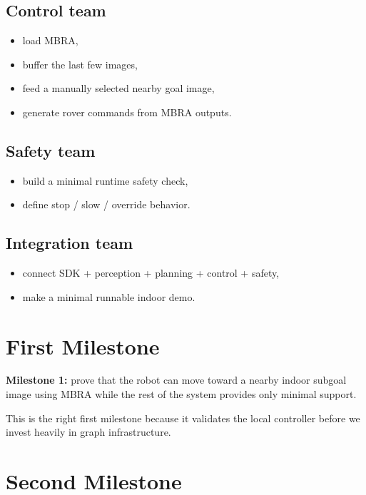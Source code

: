 \documentclass[11pt,a4paper]{article}
\begin{document}
\subsection*{Control team}
\begin{itemize}[nosep]
  \item load MBRA,
  \item buffer the last few images,
  \item feed a manually selected nearby goal image,
  \item generate rover commands from MBRA outputs.
\end{itemize}

\subsection*{Safety team}
\begin{itemize}[nosep]
  \item build a minimal runtime safety check,
  \item define stop / slow / override behavior.
\end{itemize}

\subsection*{Integration team}
\begin{itemize}[nosep]
  \item connect SDK + perception + planning + control + safety,
  \item make a minimal runnable indoor demo.
\end{itemize}


\section{First Milestone}

\begin{mdframed}
\textbf{Milestone 1:} prove that the robot can move toward a nearby indoor
subgoal image using MBRA while the rest of the system provides only minimal
support.
\end{mdframed}

This is the right first milestone because it validates the local controller
before we invest heavily in graph infrastructure.


\section{Second Milestone}
\end{document}
